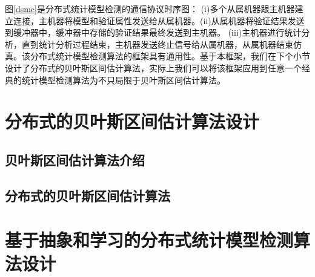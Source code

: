 \begin{figure}[htbp]
\end{figure}
图\ref{dsmc}是分布式统计模型检测的通信协议时序图： (i)多个从属机器跟主机器建立连接，主机器将模型和验证属性发送给从属机器。(ii)从属机器将验证结果发送到缓冲器中，缓冲器中存储的验证结果最终发送到主机器。 (iii)主机器进行统计分析，直到统计分析过程结束，主机器发送终止信号给从属机器，从属机器结束仿真。该分布式统计模型检测算法的框架具有通用性。基于本框架，我们在下个小节设计了分布式的贝叶斯区间估计算法，实际上我们可以将该框架应用到任意一个经典的统计模型检测算法为不只局限于贝叶斯区间估计算法。
\section{分布式的贝叶斯区间估计算法设计}
\subsection{贝叶斯区间估计算法介绍}
\subsection{分布式的贝叶斯区间估计算法}
\section{基于抽象和学习的分布式统计模型检测算法设计}

